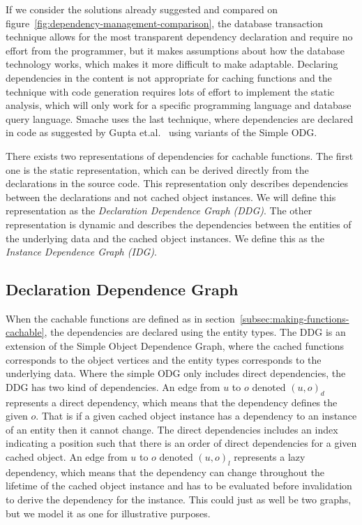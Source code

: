If we consider the solutions already suggested and compared on figure~\ref{fig:dependency-management-comparison}, the database transaction technique allows for the most transparent dependency declaration and require no effort from the programmer, but it makes assumptions about how the database technology works, which makes it more difficult to make adaptable. Declaring dependencies in the content is not appropriate for caching functions and the technique with code generation requires lots of effort to implement the static analysis, which will only work for a specific programming language and database query language. Smache uses the last technique, where dependencies are declared in code as suggested by Gupta et.al.~\cite{paper:cache-genie} using variants of the Simple ODG.

There exists two representations of dependencies for cachable functions. The first one is the static representation, which can be derived directly from the declarations in the source code. This representation only describes dependencies between the declarations and not cached object instances. We will define this representation as the \emph{Declaration Dependence Graph (DDG)}. The other representation is dynamic and describes the dependencies between the entities of the underlying data and the cached object instances. We define this as the \emph{Instance Dependence Graph (IDG)}.

\subsection{Declaration Dependence Graph}
\label{subsec:declaration-dependence-graph}

When the cachable functions are defined as in section~\ref{subsec:making-functions-cachable}, the dependencies are declared using the entity types. The DDG is an extension of the Simple Object Dependence Graph, where the cached functions corresponds to the object vertices and the entity types corresponds to the underlying data. Where the simple ODG only includes direct dependencies, the DDG has two kind of dependencies. An edge from $u$ to $o$ denoted $(u, o)_d$ represents a direct dependency, which means that the dependency defines the given $o$. That is if a given cached object instance has a dependency to an instance of an entity then it cannot change. The direct dependencies includes an index indicating a position such that there is an order of direct dependencies for a given cached object. An edge from $u$ to $o$ denoted $(u, o)_l$ represents a lazy dependency, which means that the dependency can change throughout the lifetime of the cached object instance and has to be evaluated before invalidation to derive the dependency for the instance. This could just as well be two graphs, but we model it as one for illustrative purposes.

